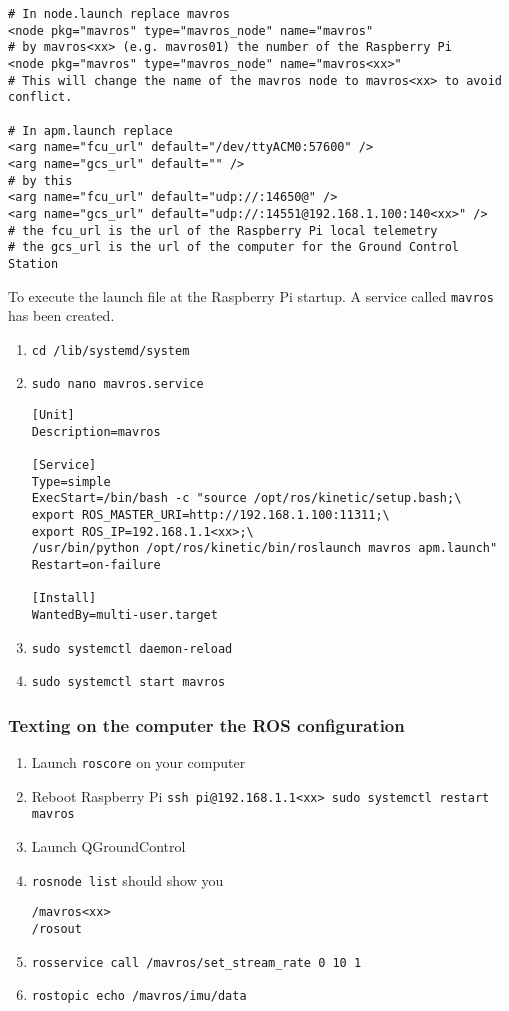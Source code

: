 \begin{verbatim}
# In node.launch replace mavros
<node pkg="mavros" type="mavros_node" name="mavros"
# by mavros<xx> (e.g. mavros01) the number of the Raspberry Pi
<node pkg="mavros" type="mavros_node" name="mavros<xx>"
# This will change the name of the mavros node to mavros<xx> to avoid conflict.

# In apm.launch replace
<arg name="fcu_url" default="/dev/ttyACM0:57600" />
<arg name="gcs_url" default="" />
# by this
<arg name="fcu_url" default="udp://:14650@" />
<arg name="gcs_url" default="udp://:14551@192.168.1.100:140<xx>" />
# the fcu_url is the url of the Raspberry Pi local telemetry
# the gcs_url is the url of the computer for the Ground Control Station
\end{verbatim}

To execute the launch file at the Raspberry Pi startup. A service called \texttt{mavros} has been created.

\begin{enumerate}
    \item \texttt{cd /lib/systemd/system}
    \item \texttt{sudo nano mavros.service}
          \begin{verbatim}
[Unit]
Description=mavros

[Service]
Type=simple
ExecStart=/bin/bash -c "source /opt/ros/kinetic/setup.bash;\
export ROS_MASTER_URI=http://192.168.1.100:11311;\
export ROS_IP=192.168.1.1<xx>;\
/usr/bin/python /opt/ros/kinetic/bin/roslaunch mavros apm.launch"
Restart=on-failure

[Install]
WantedBy=multi-user.target
                    \end{verbatim}
    \item \texttt{sudo systemctl daemon-reload}
    \item \texttt{sudo systemctl start mavros}
\end{enumerate}

\subsubsection{Texting on the computer the ROS configuration}
\begin{enumerate}
    \item Launch \texttt{roscore} on your computer
    \item Reboot Raspberry Pi \texttt{ssh pi@192.168.1.1<xx> sudo systemctl restart mavros}
    \item Launch QGroundControl
    \item \texttt{rosnode list} should show you

          \begin{verbatim}
/mavros<xx>
/rosout
          \end{verbatim}
    \item \texttt{rosservice call /mavros/set\_stream\_rate 0 10 1}
    \item \texttt{rostopic echo /mavros/imu/data}
\end{enumerate}


